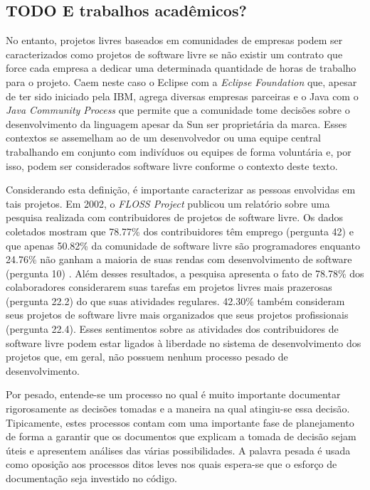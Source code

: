 \subsection*{TODO E trabalhos acadêmicos?}

No entanto, projetos livres baseados em comunidades de empresas podem
ser caracterizados como projetos de software livre se não existir um
contrato que force cada empresa a dedicar uma determinada quantidade
de horas de trabalho para o projeto. Caem neste caso o Eclipse com a
\emph{Eclipse Foundation} que, apesar de ter sido iniciado pela IBM,
agrega diversas empresas parceiras e o Java com o \emph{Java Community
  Process} que permite que a comunidade tome decisões sobre o
desenvolvimento da linguagem apesar da Sun ser proprietária da
marca. Esses contextos se assemelham ao de um desenvolvedor ou uma
equipe central trabalhando em conjunto com indivíduos ou equipes de
forma voluntária e, por isso, podem ser considerados software livre
conforme o contexto deste texto.

Considerando esta definição, é importante caracterizar as pessoas
envolvidas em tais projetos. Em 2002, o \emph{FLOSS Project}
\cite{FlossProject} publicou um relatório sobre uma pesquisa realizada
com contribuidores de projetos de software livre. Os dados coletados
mostram que 78.77\% dos contribuidores têm emprego (pergunta 42) e que
apenas 50.82\% da comunidade de software livre são programadores
enquanto 24.76\% não ganham a maioria de suas rendas com
desenvolvimento de software (pergunta 10) \cite{FlossStats}. Além
desses resultados, a pesquisa apresenta o fato de 78.78\% dos
colaboradores considerarem suas tarefas em projetos livres mais
prazerosas (pergunta 22.2) do que suas atividades regulares. 42.30\%
também consideram seus projetos de software livre mais organizados que
seus projetos profissionais (pergunta 22.4).  Esses sentimentos sobre
as atividades dos contribuidores de software livre podem estar ligados
à liberdade no sistema de desenvolvimento dos projetos que, em geral,
não possuem nenhum processo pesado de desenvolvimento.

Por pesado, entende-se um processo no qual é muito importante
documentar rigorosamente as decisões tomadas e a maneira na qual
atingiu-se essa decisão. Tipicamente, estes processos contam com uma
importante fase de planejamento de forma a garantir que os documentos
que explicam a tomada de decisão sejam úteis e apresentem análises das
várias possibilidades. A palavra pesada é usada como oposição aos
processos ditos leves nos quais espera-se que o esforço de
documentação seja investido no código. %

